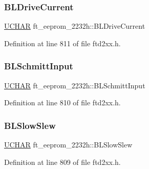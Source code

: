 \subsubsection{\texorpdfstring{B\+L\+Drive\+Current}{BLDriveCurrent}}
{\footnotesize\ttfamily \hyperlink{CatCaloProto40MHz_2inc_2WinTypes_8h_a4f4bb67531a9bf6f0b9c6ad76aeba587}{U\+C\+H\+AR} ft\+\_\+eeprom\+\_\+2232h\+::\+B\+L\+Drive\+Current}



Definition at line 811 of file ftd2xx.\+h.

\mbox{\label{structft__eeprom__2232h_a5f44424e437a8f95a08123f35c813e17}} 
\subsubsection{\texorpdfstring{B\+L\+Schmitt\+Input}{BLSchmittInput}}
{\footnotesize\ttfamily \hyperlink{CatCaloProto40MHz_2inc_2WinTypes_8h_a4f4bb67531a9bf6f0b9c6ad76aeba587}{U\+C\+H\+AR} ft\+\_\+eeprom\+\_\+2232h\+::\+B\+L\+Schmitt\+Input}



Definition at line 810 of file ftd2xx.\+h.

\mbox{\label{structft__eeprom__2232h_ac04377c073041676bf56e25152572952}} 
\subsubsection{\texorpdfstring{B\+L\+Slow\+Slew}{BLSlowSlew}}
{\footnotesize\ttfamily \hyperlink{CatCaloProto40MHz_2inc_2WinTypes_8h_a4f4bb67531a9bf6f0b9c6ad76aeba587}{U\+C\+H\+AR} ft\+\_\+eeprom\+\_\+2232h\+::\+B\+L\+Slow\+Slew}



Definition at line 809 of file ftd2xx.\+h.

\mbox{\label{structft__eeprom__2232h_a9b818fef5106306f0fb8456979164d4e}} 

